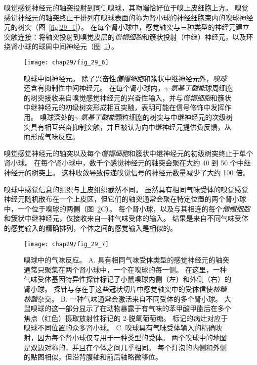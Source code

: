 嗅觉感觉神经元的轴突投射到同侧嗅球，其吻端恰好位于嗅上皮细胞上方。
嗅觉感觉神经元的轴突终止于排列在嗅球表面的称为肾小球的神经细胞束内的嗅球神经元的树突（图~\ref{fig:29_1}）。
在每个肾小球中，感觉轴突与三种类型的神经元建立突触连接：将轴突投射到嗅觉皮层的\textit{僧帽细胞}和簇状投射（中继）神经元，以及环绕肾小球的球周中间神经元（图~\ref{fig:29_6}）。


\begin{figure}[htbp]
	\centering
	\texttt{[image: chap29/fig\_29\_6]}
	\caption{嗅球中间神经元。
		除了兴奋性\textit{僧帽细胞}和簇状中继神经元外，\textit{嗅球}还含有抑制性中间神经元。
		在每个肾小球内，\textit{$\gamma$-氨基丁酸能}球周细胞的树突接收来自嗅觉感觉神经元的兴奋性输入，并与\textit{僧帽细胞}和簇状中继神经元的初级树突形成相互突触，表明可能在信号修饰中发挥作用。
		嗅球深处的\textit{$\gamma$-氨基丁酸能}颗粒细胞的树突与中继神经元的次级树突具有相互兴奋抑制突触，并且被认为向中继神经元提供负反馈，从而形成气味反应\cite{haberly1998synaptic}。}
	\label{fig:29_6}
\end{figure}



嗅觉感觉神经元的轴突以及每个\textit{僧帽细胞}和簇状中继神经元的初级树突终止于单个肾小球。
在每个肾小球中，数千个感觉神经元的轴突会聚在大约 40 到 50 个中继神经元的树突上。
这种收敛导致传递嗅觉信号的神经元数量减少了大约 100 倍。


嗅球中感觉信息的组织与上皮组织截然不同。
虽然具有相同气味受体的嗅觉感觉神经元随机散布在一个上皮区，但它们的轴突通常会聚在特定位置的两个肾小球中，一个位于嗅球的两侧（图~\ref{fig:29_7}C）。
每个肾小球，以及与其相连的每个\textit{僧帽细胞}和簇状中继神经元，仅接收来自一种气味受体的输入。
结果是来自不同气味受体的感觉输入的精确排列，个体之间的感觉输入是相似的。


\begin{figure}[htbp]
	\centering
	\texttt{[image: chap29/fig\_29\_7]}
	\caption{嗅球中的气味反应。
		A. 具有相同气味受体类型的感觉神经元的轴突通常只聚集在两个肾小球中，一个在嗅球的每一侧。
		在这里，一种气味受体基因特异性探针标记了小鼠嗅球内侧（左）和外侧（右）的肾小球。
		探针与存在于这些冠状切片中感觉轴突中的受体信使\textit{核糖核酸}杂交\cite{ressler1994information}。
		B. 一种气味通常会激活来自不同受体的多个肾小球。
		大鼠嗅球的这一部分显示了在动物暴露于有气味的苯甲酸甲酯后在多个焦点（红色）摄取放射性标记的 2-脱氧葡萄糖。
		标记的病灶对应于嗅球不同位置的众多肾小球\cite{johnson2005interactions}。
		C. 嗅球具有气味受体输入的精确映射，因为每个肾小球仅专用于一种类型的受体。
		两个嗅球中的地图是双边对称的，并且在个体之间几乎相同。
		每个灯泡的内侧和外侧的贴图相似，但沿背腹轴和前后轴略微移位。}
	\label{fig:29_7}
\end{figure}


